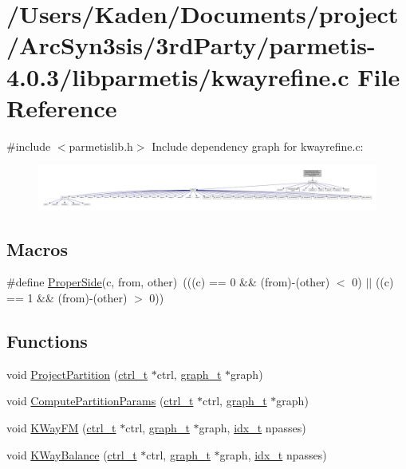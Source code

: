 \hypertarget{a00918}{}\section{/\+Users/\+Kaden/\+Documents/project/\+Arc\+Syn3sis/3rd\+Party/parmetis-\/4.0.3/libparmetis/kwayrefine.c File Reference}
\label{a00918}
{\ttfamily \#include $<$parmetislib.\+h$>$}\newline
Include dependency graph for kwayrefine.\+c\+:\nopagebreak
\begin{figure}[H]
\begin{center}
\leavevmode
\includegraphics[width=350pt]{a00919}
\end{center}
\end{figure}
\subsection*{Macros}
\begin{DoxyCompactItemize}
\item 
\#define \hyperlink{a00918_a0fc4274c04fd700ac3a3594ef91e15c7}{Proper\+Side}(c,  from,  other)~(((c) == 0 \&\& (from)-\/(other) $<$ 0) $\vert$$\vert$ ((c) == 1 \&\& (from)-\/(other) $>$ 0))
\end{DoxyCompactItemize}
\subsection*{Functions}
\begin{DoxyCompactItemize}
\item 
void \hyperlink{a00918_a1855d8886d0181410fa4e010c9792105}{Project\+Partition} (\hyperlink{a00742}{ctrl\+\_\+t} $\ast$ctrl, \hyperlink{a00734}{graph\+\_\+t} $\ast$graph)
\item 
void \hyperlink{a00918_a2fdeee823a8743e900301c088677bdf3}{Compute\+Partition\+Params} (\hyperlink{a00742}{ctrl\+\_\+t} $\ast$ctrl, \hyperlink{a00734}{graph\+\_\+t} $\ast$graph)
\item 
void \hyperlink{a00918_aa8348aa8c00e61bdc9f77041bea6eba9}{K\+Way\+FM} (\hyperlink{a00742}{ctrl\+\_\+t} $\ast$ctrl, \hyperlink{a00734}{graph\+\_\+t} $\ast$graph, \hyperlink{a00876_aaa5262be3e700770163401acb0150f52}{idx\+\_\+t} npasses)
\item 
void \hyperlink{a00918_a2411a874a11b4660effe52a3b3c4c701}{K\+Way\+Balance} (\hyperlink{a00742}{ctrl\+\_\+t} $\ast$ctrl, \hyperlink{a00734}{graph\+\_\+t} $\ast$graph, \hyperlink{a00876_aaa5262be3e700770163401acb0150f52}{idx\+\_\+t} npasses)
\end{DoxyCompactItemize}


